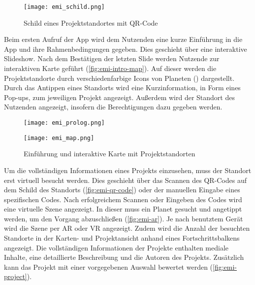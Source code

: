 
\begin{figure}[htpb]
    \centering
    \texttt{[image: emi\_schild.png]}
    \caption{Schild eines Projektstandortes mit QR-Code}
    \label{fig:emi-qr-code}
\end{figure}

Beim ersten Aufruf der App wird dem Nutzenden eine kurze Einführung in die App
und ihre Rahmenbedingungen gegeben. Dies geschieht über eine interaktive
Slideshow. Nach dem Bestätigen der letzten Slide werden Nutzende zur
interaktiven Karte geführt (\autoref{fig:emi-intro-map}). Auf dieser werden die
Projektstandorte durch verschiedenfarbige Icons von Planeten
() dargestellt. Durch das Antippen eines Standorts
wird eine Kurzinformation, in Form eines Pop-ups, zum jeweiligen Projekt
angezeigt. Außerdem wird der Standort des Nutzenden angezeigt, insofern die
Berechtigungen dazu gegeben werden.

\begin{figure}[htpb]
    \begin{minipage}{.5\textwidth}
        \centering
        \texttt{[image: emi\_prolog.png]}
    \end{minipage}%
    \begin{minipage}{.5\textwidth}
        \centering
        \texttt{[image: emi\_map.png]}
    \end{minipage}
    \caption{Einführung und interaktive Karte mit Projektstandorten}
    \label{fig:emi-intro-map}
\end{figure}

Um die vollständigen Informationen eines Projekts einzusehen, muss der
Standort erst virtuell besucht werden. Dies geschieht über das Scannen des
QR-Codes auf dem Schild des Standorts (\autoref{fig:emi-qr-code}) oder der
manuellen Eingabe eines spezifischen Codes. Nach erfolgreichem Scannen oder
Eingeben des Codes wird eine virtuelle Szene angezeigt. In dieser muss ein
Planet gesucht und angetippt werden, um den Vorgang abzuschließen (\autoref{fig:emi-ar}). Je nach benutztem Gerät wird die Szene per \ac{AR} oder \ac{VR} angezeigt. Zudem wird die Anzahl der
besuchten Standorte in der Karten- und Projektansicht anhand eines
Fortschrittsbalkens angezeigt. Die vollständigen Informationen der Projekte
enthalten mediale Inhalte, eine detaillierte Beschreibung und die Autoren des
Projekts. Zusätzlich kann das Projekt mit einer vorgegebenen Auswahl bewertet
werden (\autoref{fig:emi-project}).

